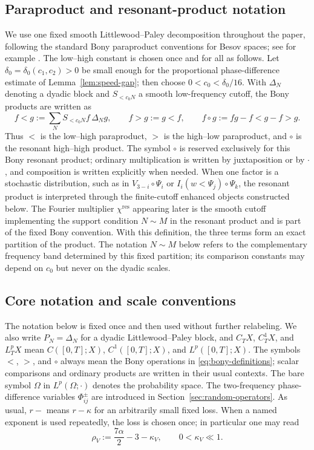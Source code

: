 \documentclass[10pt]{amsart}
\numberwithin{equation}{section}
\theoremstyle{plain}
\theoremstyle{definition}
\theoremstyle{remark}
\begin{document}
\subsection{Paraproduct and resonant-product notation}\label{subsec:bony-notation}
We use one fixed smooth Littlewood--Paley decomposition throughout the paper, following the standard Bony paraproduct conventions for Besov spaces; see for example \cite{BCD}.  The low--high constant is chosen once and for all as follows.  Let $\delta_0=\delta_0(c_1,c_2)>0$ be small enough for the proportional phase-difference estimate of Lemma~\ref{lem:speed-gap}; then choose $0<c_0<\delta_0/16$.  With $\Delta_N$ denoting a dyadic block and $S_{<c_0N}$ a smooth low-frequency cutoff, the Bony products are written as
\begin{equation}\label{eq:bony-definitions}
 f<g:=\sum_N S_{<c_0N}f\,\Delta_Ng,
 \qquad
 f>g:=g<f,
 \qquad
 f\circ g:=fg-f<g-f>g.
\end{equation}
Thus $<$ is the low--high paraproduct, $>$ is the high--low paraproduct, and $\circ$ is the resonant high--high product.  The symbol $\circ$ is reserved exclusively for this Bony resonant product; ordinary multiplication is written by juxtaposition or by $\cdot$, and composition is written explicitly when needed.  When one factor is a stochastic distribution, such as in $V_{3-i}\circ\Psi_i$ or $I_i(w<\Psi_j)\circ\Psi_k$, the resonant product is interpreted through the finite-cutoff enhanced objects constructed below.  The Fourier multiplier $\chi^{\mathrm{res}}$ appearing later is the smooth cutoff implementing the support condition $N\sim M$ in the resonant product and is part of the fixed Bony convention.
With this definition, the three terms form an exact partition of the product.  The notation $N\sim M$ below refers to the complementary frequency band determined by this fixed partition; its comparison constants may depend on $c_0$ but never on the dyadic scales.

\subsection{Core notation and scale conventions}\label{subsec:notation-guide}
The notation below is fixed once and then used without further relabeling.  We also write $P_N=\Delta_N$ for a dyadic Littlewood--Paley block, and $C_TX$, $C_T^1X$, and $L_T^pX$ mean $C([0,T];X)$, $C^1([0,T];X)$, and $L^p([0,T];X)$.  The symbols $<$, $>$, and $\circ$ always mean the Bony operations in \eqref{eq:bony-definitions}; scalar comparisons and ordinary products are written in their usual contexts.  The bare symbol $\Omega$ in $L^p(\Omega;\cdot)$ denotes the probability space.  The two-frequency phase-difference variables $\Phi_{ij}^{\pm}$ are introduced in Section~\ref{sec:random-operators}.  As usual, $r-$ means $r-\kappa$ for an arbitrarily small fixed loss.  When a named exponent is used repeatedly, the loss is chosen once; in particular one may read
\begin{equation}\label{eq:rhoV-notation-guide}
 \rho_V:=\frac{7\alpha}{2}-3-\kappa_V,\qquad 0<\kappa_V\ll1.
\end{equation}
\end{document}
